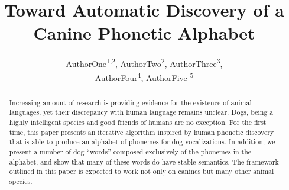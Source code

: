 \documentclass[letterpaper]{article}
\title{Toward Automatic Discovery of a Canine Phonetic Alphabet}
\author{
       AuthorOne\equalcontrib\textsuperscript{\rm 1,\rm 2},
       AuthorTwo\equalcontrib\textsuperscript{\rm 2},
       AuthorThree\textsuperscript{\rm 3},\\
       AuthorFour\textsuperscript{\rm 4},
       AuthorFive \textsuperscript{\rm 5}}
\begin{document}
\maketitle
\begin{abstract}
Increasing amount of research is providing evidence for the existence of animal languages, yet their discrepancy with human language remains unclear. Dogs, being a highly intelligent species and good friends of humans are no exception. For the first time, this paper presents an iterative algorithm inspired by human phonetic discovery that is able to produce an alphabet of phonemes for dog vocalizations. In addition, we present a number of dog ``words'' composed exclusively of the phonemes in the alphabet, and show that many of these words do have stable semantics. The framework outlined in this paper is expected to work not only on canines but many other animal species.
\end{abstract}


%




%


%

%
\end{document}
